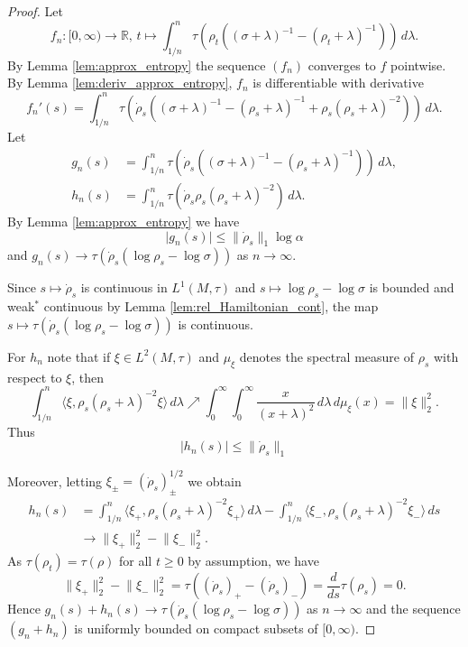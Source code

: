 \documentclass[12pt,a4paper]{amsart}
\newcommand{\1}{\mathds{1}}
\renewcommand{\L}{\mathcal L}
\newcommand{\IR}{\mathbb R}
\newcommand{\abs}[1]{\lvert#1\rvert}
\newcommand{\norm}[1]{\lVert#1\rVert}
\theoremstyle{plain}
\theoremstyle{definition}
\theoremstyle{remark}
\begin{document}
\begin{proof}
Let
\begin{equation*}
f_n\colon [0,\infty)\to \IR,\,t\mapsto\int_{1/n}^n \tau(\rho_t((\sigma+\lambda)^{-1}-(\rho_t+\lambda)^{-1}))\,d\lambda.
\end{equation*}
By Lemma \ref{lem:approx_entropy} the sequence $(f_n)$ converges to $f$ pointwise. By Lemma \ref{lem:deriv_approx_entropy}, $f_n$ is differentiable with derivative 
\begin{equation*}
f_n'(s)=\int_{1/n}^n \tau(\dot\rho_s((\sigma+\lambda)^{-1}-(\rho_s+\lambda)^{-1}+\rho_s(\rho_s+\lambda)^{-2}))\,d\lambda.
\end{equation*}
Let
\begin{align*}
g_n(s)&=\int_{1/n}^n \tau(\dot\rho_s((\sigma+\lambda)^{-1}-(\rho_s+\lambda)^{-1}))\,d\lambda,\\
h_n(s)&=\int_{1/n}^n \tau(\dot\rho_s\rho_s(\rho_s+\lambda)^{-2})\,d\lambda.
\end{align*}
By Lemma \ref{lem:approx_entropy} we have
\begin{equation*}
\abs{g_n(s)}\leq \norm{\dot\rho_s}_1\log\alpha%
\end{equation*}
and $g_n(s)\to \tau(\dot\rho_s(\log\rho_s-\log\sigma))$ as $n\to\infty$.

Since $s\mapsto \dot\rho_s$ is continuous in $L^1(M,\tau)$ and $s\mapsto \log\rho_s-\log\sigma$ is bounded and weak$^\ast$ continuous by Lemma \ref{lem:rel_Hamiltonian_cont}, the map $s\mapsto \tau(\dot\rho_s(\log\rho_s-\log\sigma))$ is continuous.

For $h_n$ note that if $\xi\in L^2(M,\tau)$ and $\mu_\xi$ denotes the spectral measure of $\rho_s$ with respect to $\xi$, then
\begin{equation*}
\int_{1/n}^n\langle\xi,\rho_s(\rho_s+\lambda)^{-2}\xi\rangle\,d\lambda\nearrow \int_0^\infty \int_0^\infty \frac{x}{(x+\lambda)^2}\,d\lambda\,d\mu_\xi(x)=\norm{\xi}_2^2.
\end{equation*}
Thus
\begin{equation*}
\abs{h_n(s)}\leq \norm{\dot\rho_s}_1%
\end{equation*}

Moreover, letting $\xi_{\pm}=(\dot\rho_s)_\pm^{1/2}$ we obtain
\begin{align*}
h_n(s)&=\int_{1/n}^n \langle\xi_+,\rho_s(\rho_s+\lambda)^{-2}\xi_+\rangle\,d\lambda-\int_{1/n}^n \langle\xi_-,\rho_s(\rho_s+\lambda)^{-2}\xi_-\rangle\,ds\\
&\to \norm{\xi_+}_2^2-\norm{\xi_-}_2^2.
\end{align*}
As $\tau(\rho_t)=\tau(\rho)$ for all $t\geq 0$ by assumption, we have
\begin{equation*}
\norm{\xi_+}_2^2-\norm{\xi_-}_2^2=\tau((\dot\rho_s)_+-(\dot\rho_s)_-)=\frac{d}{ds}\tau(\rho_s)=0.
\end{equation*}
Hence $g_n(s)+h_n(s)\to \tau(\dot\rho_s(\log\rho_s-\log\sigma))$ as $n\to\infty$ and the sequence $(g_n+h_n)$ is uniformly bounded on compact subsets of $[0,\infty)$.


\end{proof}
\end{document}
